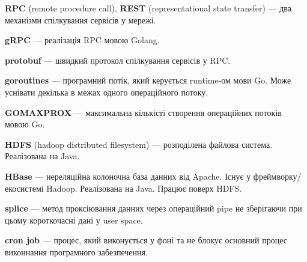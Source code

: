 \shortings

\textbf{RPC} (remote procedure call), \textbf{REST} (representational state transfer) --- два механізми спілкування сервісів у мережі.

\textbf{gRPC} --- реалізація RPC мовою Golang.

\textbf{protobuf} --- швидкий протокол спілкування сервісів у RPC.

\textbf{goroutines} --- програмний потік, який керується runtime-ом мови Go. Може уснівати декілька в межах одного операційного потоку.

\textbf{GOMAXPROX} --- максимальна кількісті створення операційних потоків мовою Go.

\textbf{HDFS} (hadoop distributed filesystem) --- розподілена файлова система. Реалізована на Java.

\textbf{HBase} --- нереляційна колоночна база данних від Apache. Існує у фреймворку/екосистемі Hadoop. Реалізована на Java. Працює поверх HDFS.

\textbf{splice} --- метод проксіювання данних через операційний pipe не зберігаючи при цьому короткочасні дані у user space.

\textbf{cron job} --- процес, який виконується у фоні та не блокує основний процес виконнання програмного забезпечення.
